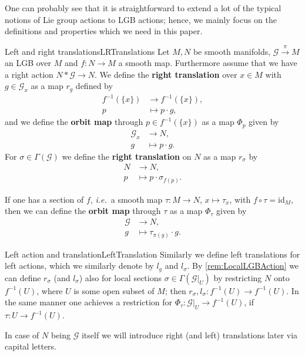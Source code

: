 \documentclass[reqno,a4paper,oneside]{amsart}
\theoremstyle{plain}
\theoremstyle{remark}
\theoremstyle{definition}
\begin{document}

One can probably see that it is straightforward to extend a lot of the typical notions of Lie group actions to LGB actions; hence, we mainly focus on the definitions and properties which we need in this paper. 

\begin{definitions}{Left and right translations}{LRTranslations}
Let $M, N$ be smooth manifolds, $\mathcal{G} \stackrel{\pi}{\to} M$ an LGB over $M$ and $f \colon N \to M$ a smooth map. Furthermore assume that we have a right action $N * \mathcal{G} \to N$. We define the \textbf{right translation} over $x \in M$ with $g \in \mathcal{G}_x$ as a map $r_g$ defined by
\begin{align*}
f^{-1}(\{x\}) &\to f^{-1}(\{x\}),\\
p &\mapsto p \cdot g,
\end{align*}
and we define the \textbf{orbit map} through $p \in f^{-1}(\{x\})$ as a map $\Phi_p$ given by
\begin{align*}
\mathcal{G}_x &\to N,\\
g&\mapsto p \cdot g.
\end{align*}
For $\sigma \in \Gamma(\mathcal{G})$ we define the \textbf{right translation} on $N$ as a map $r_\sigma$ by
\begin{align*}
N &\to N,\\
p &\mapsto p \cdot \sigma_{f(p)}.
\end{align*}

If one has a section of $f$, \textit{i.e.}\ a smooth map $\tau: M \to N$, $x \mapsto \tau_x$, with $f \circ \tau = \mathrm{id}_M$, then we can define the \textbf{orbit map} through $\tau$ as a map $\Phi_\tau$ given by
\begin{align*}
\mathcal{G} &\to N,\\
g &\mapsto \tau_{\pi(g)} \cdot g.
\end{align*}
\end{definitions}

\begin{remarks}{Left action and translation}{LeftTranslation}
Similarly we define left translations for left actions, which we similarly denote by $l_g$ and $l_\sigma$. By \ref{rem:LocalLGBAction} we can define $r_\sigma$ (and $l_\sigma$) also for local sections $\sigma \in \Gamma(\mathcal{G}|_U)$ by restricting $N$ onto $f^{-1}(U)$, where $U$ is some open subset of $M$; then $r_\sigma, l_\sigma: f^{-1}(U) \to f^{-1}(U)$. In the same manner one achieves a restriction for $\Phi_\tau \colon \mathcal{G}|_U \to f^{-1}(U)$, if $\tau: U \to f^{-1}(U)$.

In case of $N$ being $\mathcal{G}$ itself we will introduce right (and left) translations later via capital letters.
\end{remarks}
\end{document}
